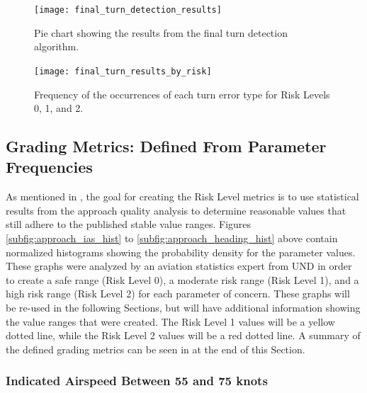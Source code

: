             \begin{figure}
            	\centering
                \texttt{[image: final\_turn\_detection\_results]}
                \caption{Pie chart showing the results from the final turn detection algorithm.}
                \label{fig:final_turn_results_ratios}
            \end{figure}
            
            \begin{figure}
            	\centering
                \texttt{[image: final\_turn\_results\_by\_risk]}
                \caption{Frequency of the occurrences of each turn error type for Risk Levels 0, 1, and 2.}
                \label{fig:final_turn_results_by_risk}
            \end{figure}


\subsection{Grading Metrics:  Defined From Parameter Frequencies}

	As mentioned in , the goal for creating the Risk Level metrics is to use statistical results from the approach quality analysis to determine reasonable values that still adhere to the published stable value ranges.  Figures \ref{subfig:approach_ias_hist} to \ref{subfig:approach_heading_hist} above contain normalized histograms showing the probability density for the parameter values.  These graphs were analyzed by an aviation statistics expert from UND in order to create a safe range (Risk Level 0), a moderate risk range (Risk Level 1), and a high risk range (Risk Level 2) for each parameter of concern.  These graphs will be re-used in the following Sections, but will have additional information showing the value ranges that were created.  The Risk Level 1 values will be a yellow dotted line, while the Risk Level 2 values will be a red dotted line.  A summary of the defined grading metrics can be seen in  at the end of this Section.
    
    	
    \subsubsection{Indicated Airspeed Between 55 and 75 knots}
    
